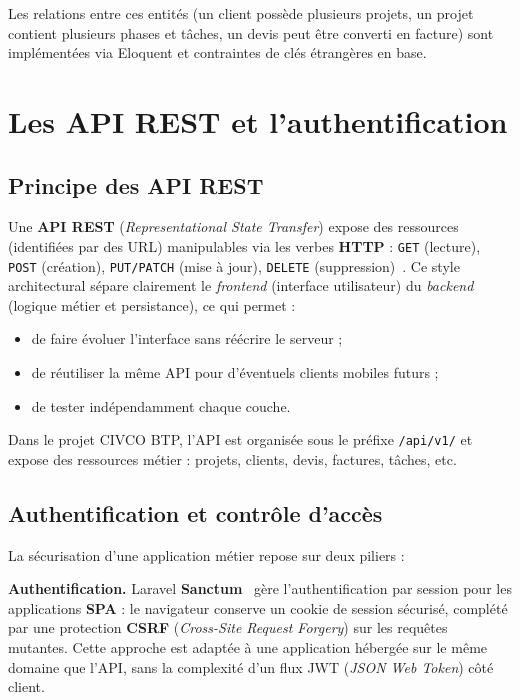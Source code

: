 Les relations entre ces entités (un client possède plusieurs projets, un projet
contient plusieurs phases et tâches, un devis peut être converti en facture) sont
implémentées via Eloquent et contraintes de clés étrangères en base.

\section{Les API REST et l'authentification}

\subsection{Principe des API REST}

Une \textbf{API REST} (\textit{Representational State Transfer}) expose des ressources
(identifiées par des URL) manipulables via les verbes \textbf{HTTP} :
\texttt{GET} (lecture), \texttt{POST} (création), \texttt{PUT/PATCH} (mise à jour),
\texttt{DELETE} (suppression)~\cite{fielding2000rest}. Ce style architectural sépare
clairement le \textit{frontend} (interface utilisateur) du \textit{backend} (logique
métier et persistance), ce qui permet :

\begin{itemize}
  \item de faire évoluer l'interface sans réécrire le serveur ;
  \item de réutiliser la même API pour d'éventuels clients mobiles futurs ;
  \item de tester indépendamment chaque couche.
\end{itemize}

Dans le projet CIVCO BTP, l'API est organisée sous le préfixe \texttt{/api/v1/} et
expose des ressources métier : projets, clients, devis, factures, tâches, etc.

\subsection{Authentification et contrôle d'accès}

La sécurisation d'une application métier repose sur deux piliers :

\medskip

\textbf{Authentification.} Laravel \textbf{Sanctum}~\cite{sanctum} gère l'authentification
par session pour les applications \textbf{SPA} : le navigateur conserve un cookie de
session sécurisé, complété par une protection \textbf{CSRF} (\textit{Cross-Site Request
Forgery}) sur les requêtes mutantes. Cette approche est adaptée à une application hébergée
sur le même domaine que l'API, sans la complexité d'un flux JWT (\textit{JSON Web Token})
côté client.

